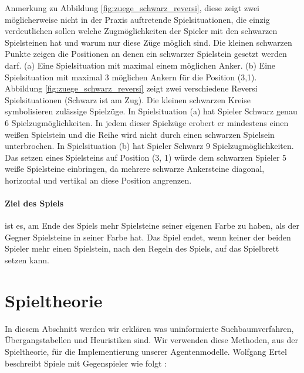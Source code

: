 Anmerkung zu Abbildung \ref{fig:zuege_schwarz_reversi}, diese zeigt zwei möglicherweise nicht in der Praxis auftretende Spielsituationen, die einzig verdeutlichen sollen welche Zugmöglichkeiten der Spieler mit den schwarzen Spielsteinen hat und warum nur diese Züge möglich sind. Die kleinen schwarzen Punkte zeigen die Positionen an denen ein schwarzer Spielstein gesetzt werden darf. (a) Eine Spielsituation mit maximal einem möglichen Anker. (b) Eine Spielsituation mit maximal 3 möglichen Ankern für die Position (3,1). \\

Abbildung \ref{fig:zuege_schwarz_reversi} zeigt zwei verschiedene Reversi Spielsituationen (Schwarz ist am Zug). Die kleinen schwarzen Kreise symbolisieren zulässige Spielzüge. In Spielsituation (a) hat Spieler Schwarz genau 6 Spielzugmöglichkeiten. In jedem dieser Spielzüge erobert er mindestens einen weißen Spielstein und die Reihe wird nicht durch einen schwarzen Spielsein unterbrochen. In Spielsituation (b) hat Spieler Schwarz 9 Spielzugmöglichkeiten. Das setzen eines Spielsteins auf Position (3, 1) würde dem schwarzen Spieler 5 weiße Spielsteine einbringen, da mehrere schwarze Ankersteine diagonal, horizontal und vertikal an diese Position angrenzen.

\paragraph{Ziel des Spiels} ist es, am Ende des Spiels mehr Spielsteine seiner eigenen Farbe zu haben, als der Gegner Spielsteine in seiner Farbe hat. Das Spiel endet, wenn keiner der beiden Spieler mehr einen Spielstein, nach den Regeln des Spiels, auf das Spielbrett setzen kann. \\

\section{Spieltheorie}
\label{sec:Spieltheorie}
In diesem Abschnitt werden wir erklären was uninformierte Suchbaumverfahren, Übergangstabellen und Heuristiken sind. Wir verwenden diese Methoden, aus der Spieltheorie, für die Implementierung unserer Agentenmodelle. Wolfgang Ertel beschreibt Spiele mit Gegenspieler wie folgt \cite[114]{Ertel}: \\ 

